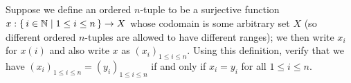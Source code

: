 \documentclass[../../main.tex]{subfiles}
\begin{document}

\addtocounter{subsection}{1}
\subsection{}
\begin{q}
    Suppose we define an ordered $n$-tuple to be a surjective function $x : \{\,i \in \mathbb{N}\mid1 \leq i \leq n\,\} \to X$ whose codomain is some arbitrary set $X$ (so different ordered $n$-tuples are allowed to have different ranges); we then write $x_i$ for $x(i)$ and also write $x$ as $(x_i)_{1 \leq i \leq n}$. Using this definition, verify that we have $(x_i)_{1 \leq i \leq n} = (y_i)_{1 \leq i \leq n}$ if and only if $x_i = y_i$ for all $1 \leq i \leq n$. 
\end{q}
\end{document}
